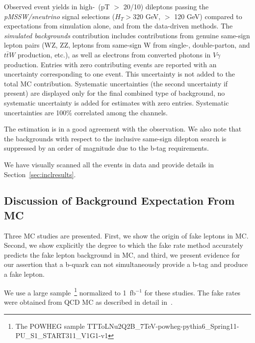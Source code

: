 \begin{table}[hbt]
\begin{center}

\end{center}
\caption{\label{tab:yieldsnu_hpt}Observed event yields in high-\pt\ (pT $>$ 20/10) dileptons
passing the {\em pMSSW/sneutrino} signal selections ($H_T > 320$ GeV, \met $>$ 120 GeV)
compared to expectations from simulation alone, and from the data-driven methods.
The {\em simulated backgrounds} contribution includes contributions from genuine  same-sign lepton
pairs (WZ, ZZ, leptons from same-sign W from single-, double-parton, and $t\bar{t}W$ production, etc.), 
as well as electrons from converted photons in $V\gamma$ production.
Entries with zero contributing events are reported with an uncertainty corresponding to one event.
This uncertainty is not added to the total MC contribution.
Systematic uncertainties (the second uncertainty if present)
 are displayed only for the final combined type of background, no systematic
uncertainty is added for estimates with zero entries.
Systematic uncertainties are 100\% correlated among the channels.
}
\end{table}

\clearpage

The estimation
is in a good agreement with the observation. We also note that the backgrounds with respect to the inclusive same-sign
dilepton search is suppressed by an order of magnitude due to the b-tag requirements.

We have visually scanned all the events in data and provide details in Section~\ref{sec:inclresults}.


\subsection{Discussion of Background Expectation From MC}
\label{sec:bkgdiscussion}

Three MC studies are presented. First, we show the origin of fake leptons in MC.
Second, we 
show explicitly the degree to which the fake rate method
accurately predicts the fake lepton background in \ttbar MC, 
and third, we present evidence for our assertion that a b-quark can not simultaneously provide a b-tag and produce a fake lepton.

We use a large \ttbar sample~\footnote{The POWHEG sample TTToLNu2Q2B\_7TeV-powheg-pythia6\_Spring11-PU\_S1\_START311\_V1G1-v1 } 
normalized to 1~fb$^{-1}$ for these studies. 
The fake rates were obtained from QCD MC as described in detail in~\cite{ssnote2011}.

